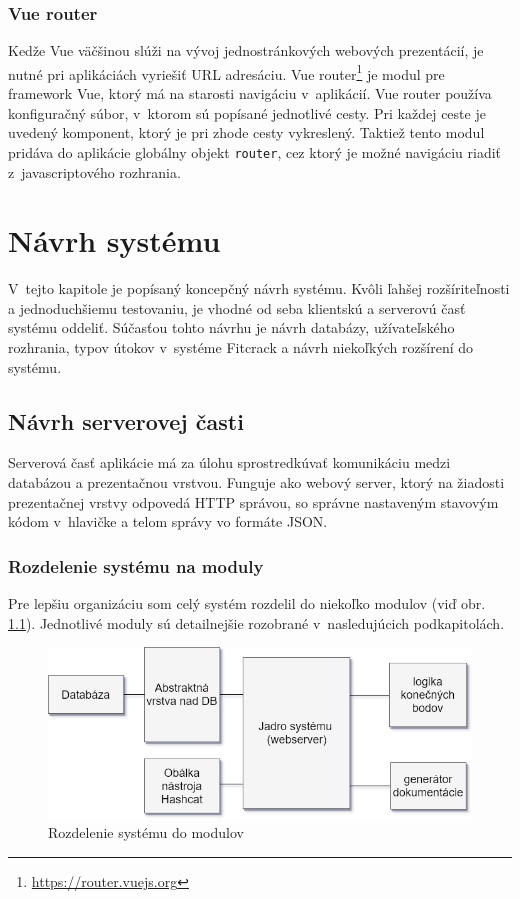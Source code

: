\documentclass[slovak]{fitthesis}
\begin{document}
\subsection{Vue router}\label{vueRouter}
Kedže Vue väčšinou slúži na vývoj jednostránkových webových prezentácií, je nutné pri aplikáciách vyriešiť URL adresáciu. Vue router\footnote{\url{https://router.vuejs.org}} je modul pre framework Vue, ktorý má na starosti navigáciu v~aplikácií. Vue router používa konfiguračný súbor, v~ktorom sú popísané jednotlivé cesty. Pri každej ceste je uvedený komponent, ktorý je pri zhode cesty vykreslený. Taktiež tento modul pridáva do aplikácie globálny objekt \texttt{router}, cez ktorý je možné navigáciu riadiť z~javascriptového rozhrania.


\chapter{Návrh systému}\label{navrh}
V~tejto kapitole je popísaný koncepčný návrh systému. Kvôli ľahšej rozšíriteľnosti a jednoduchšiemu testovaniu, je vhodné od seba klientskú a serverovú časť systému oddeliť. Súčasťou tohto návrhu je  návrh databázy, užívateľského rozhrania, typov útokov v~systéme Fitcrack a návrh niekoľkých rozšírení do systému. 

\section{Návrh serverovej časti}\label{navrhServer}
Serverová časť aplikácie má za úlohu sprostredkúvať komunikáciu medzi databázou a prezentačnou vrstvou. Funguje ako webový server, ktorý na žiadosti prezentačnej vrstvy odpovedá HTTP správou, so správne nastaveným stavovým kódom v~hlavičke a telom správy vo formáte JSON.

\subsection{Rozdelenie systému na moduly}
Pre lepšiu organizáciu som celý systém rozdelil do niekoľko modulov (viď obr. \ref{fig:moduly}). Jednotlivé moduly sú detailnejšie rozobrané v~nasledujúcich podkapitolách. 

\begin{figure}[h]
    \centering
    \includegraphics[scale=0.6]{obrazky/moduly.png}
    \caption{Rozdelenie systému do modulov}
    \label{fig:moduly}
\end{figure}
\end{document}
